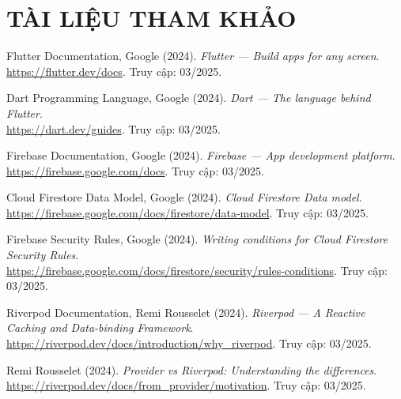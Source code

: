 \chapter*{TÀI LIỆU THAM KHẢO}

\begin{enumerate}[label={[\arabic*]}]

  \item Flutter Documentation, Google (2024). \textit{Flutter --- Build apps for any screen}.\\
  \url{https://flutter.dev/docs}. Truy cập: 03/2025.

  \item Dart Programming Language, Google (2024). \textit{Dart --- The language behind Flutter}.\\
  \url{https://dart.dev/guides}. Truy cập: 03/2025.

  \item Firebase Documentation, Google (2024). \textit{Firebase --- App development platform}.\\
  \url{https://firebase.google.com/docs}. Truy cập: 03/2025.

  \item Cloud Firestore Data Model, Google (2024). \textit{Cloud Firestore Data model}.\\
  \url{https://firebase.google.com/docs/firestore/data-model}. Truy cập: 03/2025.

  \item Firebase Security Rules, Google (2024). \textit{Writing conditions for Cloud Firestore Security Rules}.\\
  \url{https://firebase.google.com/docs/firestore/security/rules-conditions}. Truy cập: 03/2025.

  \item Riverpod Documentation, Remi Rousselet (2024). \textit{Riverpod --- A Reactive Caching and Data-binding Framework}.\\
  \url{https://riverpod.dev/docs/introduction/why_riverpod}. Truy cập: 03/2025.

  \item Remi Rousselet (2024). \textit{Provider vs Riverpod: Understanding the differences}.\\
  \url{https://riverpod.dev/docs/from_provider/motivation}. Truy cập: 03/2025.


\end{enumerate}
